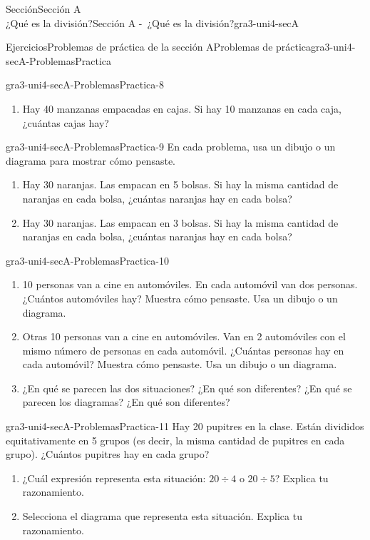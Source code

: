 \begin{sectionptx}{Sección}{{\Large Sección A\\}¿Qué es la división?}{}{Sección A -~¿Qué es la división?}{}{}{gra3-uni4-secA}
\begin{exercises-subsection}{Ejercicios}{Problemas de práctica de la sección A}{}{Problemas de práctica}{}{}{gra3-uni4-secA-ProblemasPractica}
\begin{divisionexercise}{6}{}{}{gra3-uni4-secA-ProblemasPractica-8}
\begin{enumerate}[label={(\alph*)}]
\item{}Hay 40 manzanas empacadas en cajas. Si hay 10 manzanas en cada caja, ¿cuántas cajas hay?%
\end{enumerate}
%
\end{divisionexercise}%
\begin{divisionexercise}{7}{}{}{gra3-uni4-secA-ProblemasPractica-9}%
En cada problema, usa un dibujo o un diagrama para mostrar cómo pensaste.%
%
\begin{enumerate}[label={(\alph*)}]
\item{}Hay 30 naranjas. Las empacan en 5 bolsas. Si hay la misma cantidad de naranjas en cada bolsa, ¿cuántas naranjas hay en cada bolsa?%
\item{}Hay 30 naranjas. Las empacan en 3 bolsas. Si hay la misma cantidad de naranjas en cada bolsa, ¿cuántas naranjas hay en cada bolsa?%
\end{enumerate}
\end{divisionexercise}%
\begin{divisionexercise}{8}{}{}{gra3-uni4-secA-ProblemasPractica-10}%
%
\begin{enumerate}[label={(\alph*)}]
\item{}10 personas van a cine en automóviles. En cada automóvil van dos personas. ¿Cuántos automóviles hay? Muestra cómo pensaste. Usa un dibujo o un diagrama.%
\item{}Otras 10 personas van a cine en automóviles. Van en 2 automóviles con el mismo número de personas en cada automóvil. ¿Cuántas personas hay en cada automóvil? Muestra cómo pensaste. Usa un dibujo o un diagrama.%
\item{}¿En qué se parecen las dos situaciones? ¿En qué son diferentes? ¿En qué se parecen los diagramas? ¿En qué son diferentes?%
\end{enumerate}
%
\end{divisionexercise}%
\clearpage
\begin{divisionexercise}{9}{}{}{gra3-uni4-secA-ProblemasPractica-11}%
Hay 20 pupitres en la clase. Están divididos equitativamente en 5 grupos (es decir, la misma cantidad de pupitres en cada grupo). ¿Cuántos pupitres hay en cada grupo?%
\par
%
\begin{enumerate}[label={(\alph*)}]
\item{}¿Cuál expresión representa esta situación: \(20\div 4\) o \(20\div 5\)? Explica tu razonamiento.%
\item{}Selecciona el diagrama que representa esta situación. Explica tu razonamiento.%

\end{enumerate}
\end{divisionexercise}
\end{exercises-subsection}
\end{sectionptx}
